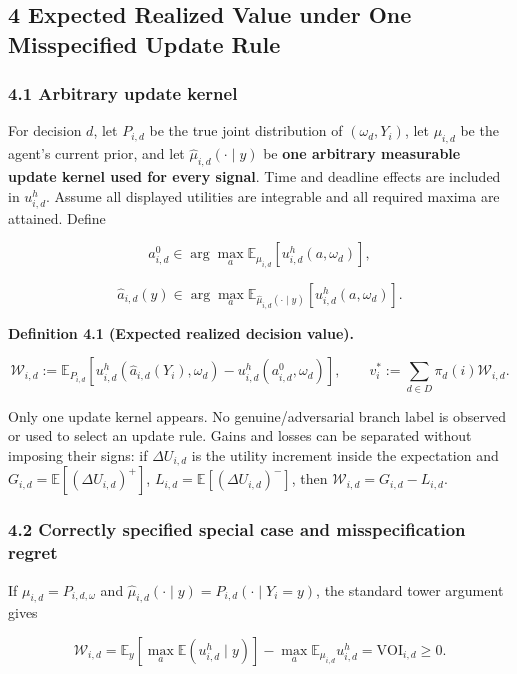 \documentclass[
  11pt]{article}
\begin{document}
\subsection{4 Expected Realized Value under One Misspecified Update
Rule}\label{expected-realized-value-under-one-misspecified-update-rule}

\subsubsection{4.1 Arbitrary update
kernel}\label{arbitrary-update-kernel}

For decision \(d\), let \(P_{i,d}\) be the true joint distribution of
\((\omega_d,Y_i)\), let \(\mu_{i,d}\) be the agent's current prior, and
let \(\widehat\mu_{i,d}(\cdot\mid y)\) be \textbf{one arbitrary
measurable update kernel used for every signal}. Time and deadline
effects are included in \(u^h_{i,d}\). Assume all displayed utilities
are integrable and all required maxima are attained. Define

\[a^0_{i,d}\in\arg\max_a\mathbb E_{\mu_{i,d}}[u^h_{i,d}(a,\omega_d)],\]

\[\widehat a_{i,d}(y)\in\arg\max_a\mathbb E_{\widehat\mu_{i,d}(\cdot\mid y)}[u^h_{i,d}(a,\omega_d)].\]

\textbf{Definition 4.1 (Expected realized decision value).}

\[\mathcal W_{i,d}:=\mathbb E_{P_{i,d}}\!\left[u^h_{i,d}(\widehat a_{i,d}(Y_i),\omega_d)-u^h_{i,d}(a^0_{i,d},\omega_d)\right],\qquad v_i^*:=\sum_{d\in D}\pi_d(i)\mathcal W_{i,d}.\]

Only one update kernel appears. No genuine/adversarial branch label is
observed or used to select an update rule. Gains and losses can be
separated without imposing their signs: if \(\Delta U_{i,d}\) is the
utility increment inside the expectation and
\(G_{i,d}=\mathbb E[(\Delta U_{i,d})^+]\),
\(L_{i,d}=\mathbb E[(\Delta U_{i,d})^-]\), then
\(\mathcal W_{i,d}=G_{i,d}-L_{i,d}\).

\subsubsection{4.2 Correctly specified special case and misspecification
regret}\label{correctly-specified-special-case-and-misspecification-regret}

If \(\mu_{i,d}=P_{i,d,\omega}\) and
\(\widehat\mu_{i,d}(\cdot\mid y)=P_{i,d}(\cdot\mid Y_i=y)\), the
standard tower argument gives

\[\mathcal W_{i,d}=\mathbb E_y\!\left[\max_a\mathbb E(u^h_{i,d}\mid y)\right]-\max_a\mathbb E_{\mu_{i,d}}u^h_{i,d}=\mathrm{VOI}_{i,d}\ge0.\]
\end{document}
